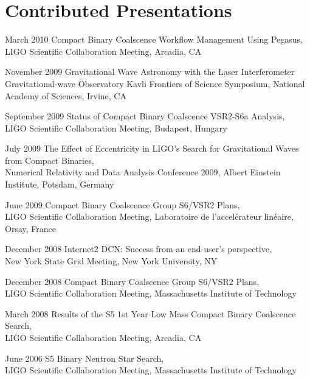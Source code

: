 \documentclass{cv}
\begin{document}
\iffalse
\section{Contributed Presentations}
\begin{entry}

\item[March 2010] {Compact Binary Coalscence Workflow Management Using Pegasus},\\
{\small LIGO Scientific Collaboration Meeting, Arcadia, CA}

\item[November 2009]{ Gravitational Wave Astronomy with the Laser Interferometer Gravitational-wave Observatory}
{\small Kavli Frontiers of Science Symposium, National Academy of Sciences,
Irvine, CA}

\item[September 2009] {Status of Compact Binary Coalscence VSR2-S6a Analysis},\\
{\small LIGO Scientific Collaboration Meeting, Budapest, Hungary}

\item[July 2009] {The Effect of Eccentricity in LIGO’s Search for Gravitational Waves from Compact Binaries},\\
{\small Numerical Relativity and Data Analysis Conference 2009, Albert Einstein Institute, Potsdam, Germany}

\item[June 2009] {Compact Binary Coalscence Group S6/VSR2 Plans},\\
{\small LIGO Scientific Collaboration Meeting, Laboratoire de l'accel\'erateur lin\'eaire, Orsay, France}

\item[December 2008]{Internet2 DCN: Success from an end-user’s perspective},\\
{\small New York State Grid Meeting, New York University, NY}

\item[December 2008] {Compact Binary Coalscence Group S6/VSR2 Plans},\\
{\small LIGO Scientific Collaboration Meeting, Massachusetts Institute of Technology}

\item[March 2008]{Results of the S5 1st Year Low Mass Compact Binary Coalscence Search},\\
{\small LIGO Scientific Collaboration Meeting, Arcadia, CA}

\item[June 2006]{S5 Binary Neutron Star Search},\\
{\small LIGO Scientific Collaboration Meeting, Massachusetts Institute of Technology}


\end{entry}
\end{document}
